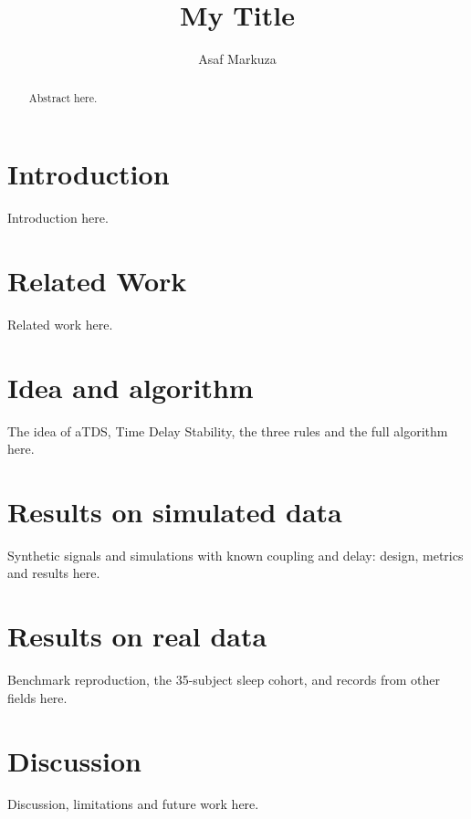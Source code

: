 \documentclass[11pt,a4paper]{article}
\title{My Title}
\author{Asaf Markuza}
\date{}
\begin{document}
\maketitle

\begin{abstract}
Abstract here.
\end{abstract}

\section{Introduction}
\label{sec:intro}
Introduction here.

\section{Related Work}
\label{sec:related_work}
Related work here.

\section{Idea and algorithm}
\label{sec:method}
The idea of aTDS, Time Delay Stability, the three rules and the full algorithm here.

\section{Results on simulated data}
\label{sec:simulation}
Synthetic signals and simulations with known coupling and delay: design, metrics and results here.

\section{Results on real data}
\label{sec:realdata}
Benchmark reproduction, the 35-subject sleep cohort, and records from other fields here.

\section{Discussion}
\label{sec:discussion}
Discussion, limitations and future work here.
\end{document}
